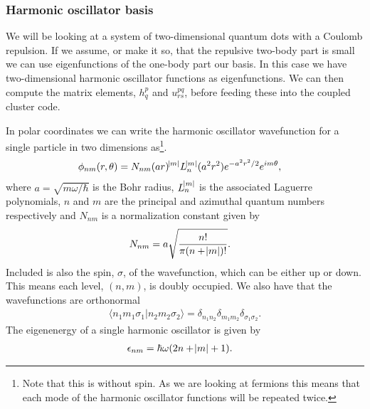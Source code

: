 \documentclass[
    a4paper, aps, twocolumn, floatfix, superscriptaddress,
    nofootinbib]{revtex4-1}
\newcommand{\1}{\mathds{1}}
\newcommand{\braket}[2]{\langle #1 \vert #2 \rangle}
\begin{document}
        \subsubsection{Harmonic oscillator basis}
            We will be looking at a system of two-dimensional quantum dots with
            a Coulomb repulsion.  If we assume, or make it so, that the
            repulsive two-body part is small we can use eigenfunctions of the
            one-body part our basis. In this case we have two-dimensional
            harmonic oscillator functions as eigenfunctions. We can then compute
            the matrix elements, $h_q^p$ and $u_{rs}^{pq}$, before feeding these
            into the coupled cluster code.

            In polar coordinates we can write the harmonic oscillator
            wavefunction for a single particle in two dimensions
            as\footnote{Note that this is without spin. As we are looking at
            fermions this means that each mode of the harmonic oscillator
            functions will be repeated twice.}.
            \begin{align}
                \phi_{nm}(r, \theta)
                &=
                N_{nm}
                (ar)^{\abs{m}}L_n^{\abs{m}}(a^2 r^2)e^{-a^2 r^2/2}
                e^{im\theta},
            \end{align}
            where $a = \sqrt{m\omega/\hbar}$ is the Bohr radius, $L_n^{\abs{m}}$
            is the associated Laguerre polynomials, $n$ and $m$ are the
            principal and azimuthal quantum numbers respectively and $N_{nm}$ is
            a normalization constant given by
            \begin{align}
                N_{nm}
                &= a\sqrt{\frac{n!}{\pi(n + \abs{m})!}}.
            \end{align}
            Included is also the spin, $\sigma$, of the wavefunction, which can
            be either up or down. This means each level, $(n, m)$, is doubly
            occupied. We also have that the wavefunctions are orthonormal
            \begin{align}
                \braket{n_1m_1\sigma_1}{n_2m_2\sigma_2}
                = \delta_{n_1n_2}\delta_{m_1m_2}\delta_{\sigma_1\sigma_2}.
            \end{align}
            The eigenenergy of a single harmonic oscillator is given by
            \begin{align}
                \epsilon_{nm} &= \hbar\omega(2n + \abs{m} + 1).
            \end{align}
\end{document}
